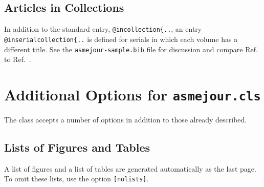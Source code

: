 \documentclass[largesc,upint,varvw,barcolor=Red4,nocopyright,hyphenate,balance,lang-second=french,lang=english]{asmejour}
\begin{document}
\subsection{Articles in Collections} In addition to the standard entry, \verb|@incollection{..|, an entry  \verb|@inserialcollection{..| is defined for serials in which each volume has a different title. See the \texttt{asmejour-sample.bib} file for discussion and compare Ref.~\cite{clauser56} to Ref.~\cite{DKE70}.



\begin{table}[t]
\caption{Table with more complicated columns}\label{tab:2}%
%
\end{table}



\section{Additional Options for \texttt{asmejour.cls}}
The class accepts a number of options in addition to those already described.

\subsection{Lists of Figures and Tables} A list of figures and a list of tables are generated automatically as the last page.  To omit these lists, use the option \texttt{[nolists]}.
\end{document}
